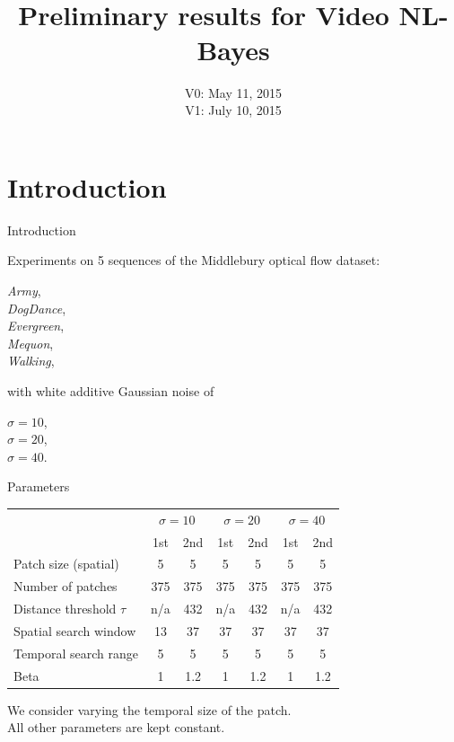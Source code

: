 \documentclass[mathserif, 8pt]{beamer}
\title[VNLB]{$\,$ \\ $\,$ \\ Preliminary results for Video NL-Bayes}
\author[Pablo Arias]{V0: May 11, 2015\\V1: July 10, 2015}
\institute[CMLA]{}
\date[]{}
\begin{document}
\begin{frame}
    \titlepage
\end{frame}

\section{Introduction}

\begin{frame}{Introduction}

	\begin{center}
	Experiments on 5 sequences of the Middlebury optical flow dataset:

	\bigskip

	\emph{Army}, \\
	\emph{DogDance}, \\
	\emph{Evergreen}, \\
	\emph{Mequon}, \\
	\emph{Walking},

	\bigskip

	with white additive Gaussian noise of 

	\bigskip
	
	$\sigma = 10$, \\ 
	$\sigma = 20$, \\ 
	$\sigma = 40$.
	\end{center}

\end{frame}

\begin{frame}{Parameters}
	\begin{center}

	\begin{tabular}{l | c c | c c | c c }
		& \multicolumn{2}{c|}{$\sigma = 10$} 
		& \multicolumn{2}{c|}{$\sigma = 20$} 
		& \multicolumn{2}{c}{$\sigma = 40$} \\
		                            & 1st  & 2nd  & 1st  & 2nd  & 1st  & 2nd \\\hline\hline
		Patch size (spatial)        &  5   &   5  &  5   &   5  &  5   &   5 \\
		Number of patches           & 375  & 375  & 375  & 375  & 375  & 375 \\
		Distance threshold $\tau$   & n/a  & 432  & n/a  & 432  & n/a  & 432 \\
		Spatial search window       & 13   & 37   & 37   & 37   & 37   & 37  \\
		Temporal search range       & 5    & 5    & 5    & 5    & 5    & 5   \\\hline
		Beta                        & 1    & 1.2  & 1    & 1.2  & 1    & 1.2 \\\hline
	\end{tabular}

	\bigskip
	\bigskip
	\bigskip

	We consider varying the temporal size of the patch.\\ All other parameters are kept constant.

	\end{center}
\end{frame}
\end{document}
